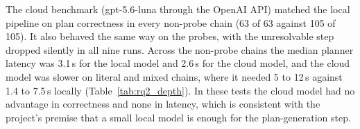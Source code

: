 \label{sec:cloud_comparison}

The cloud benchmark (gpt-5.6-luna through the OpenAI API) matched the 
local pipeline on plan correctness in every non-probe chain (63 of 63 against 105 of 105). 
It also behaved the same way on the probes, with the unresolvable step dropped silently 
in all nine runs. Across the non-probe chains the median planner latency was 3.1\,s for 
the local model and 2.6\,s for the cloud model, and the cloud model was slower on literal 
and mixed chains, where it needed 5 to 12\,s against 1.4 to 7.5\,s locally (Table~\ref{tab:rq2_depth}). 
In these tests the cloud model had no advantage in correctness and none in latency, which is consistent 
with the project's premise that a small local model is enough for the plan-generation step. 